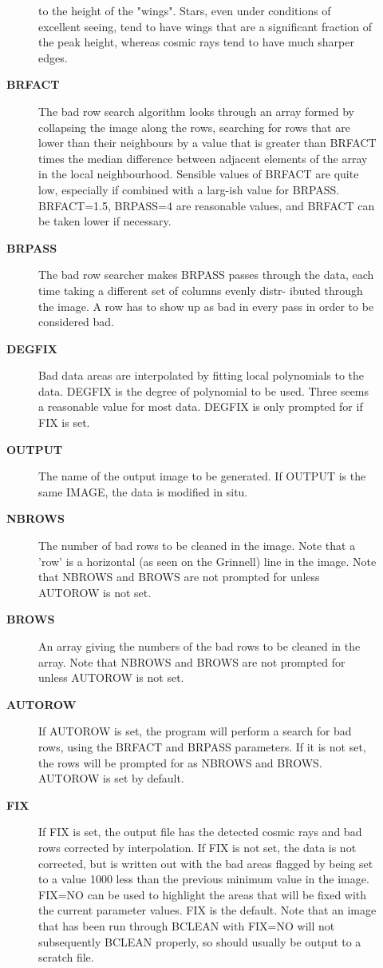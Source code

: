 \begin{description}
\begin{description}
 to the height of the "wings". Stars, even under conditions
 of excellent seeing, tend to have wings that are a
 significant fraction of the peak height, whereas cosmic
 rays tend to have much sharper edges.
\item [\textbf{BRFACT}]
 The bad row search algorithm looks through an array formed
 by collapsing the image along the rows, searching for rows
 that are lower than their neighbours by a value that is
 greater than BRFACT times the median difference between
 adjacent elements of the array in the local neighbourhood.
 Sensible values of BRFACT are quite low, especially if
 combined with a larg-ish value for BRPASS.  BRFACT=1.5,
 BRPASS=4 are reasonable values, and BRFACT can be taken
 lower if necessary.
\item [\textbf{BRPASS}]
 The bad row searcher makes BRPASS passes through the data,
 each time taking a different set of columns evenly distr-
 ibuted through the image.  A row has to show up as bad in
 every pass in order to be considered bad.
\item [\textbf{DEGFIX}]
 Bad data areas are interpolated by fitting local polynomials
 to the data.  DEGFIX is the degree of polynomial to be used.
 Three seems a reasonable value for most data.  DEGFIX is only
 prompted for if FIX is set.
\item [\textbf{OUTPUT}]
 The name of the output image to be generated.
 If OUTPUT is the same IMAGE, the data is modified in situ.
\item [\textbf{NBROWS}]
 The number of bad rows to be cleaned in the image.
 Note that a 'row' is a horizontal (as seen on the Grinnell)
 line in the image.  Note that NBROWS and BROWS are not
 prompted for unless AUTOROW is not set.
\item [\textbf{BROWS}]
 An array giving the numbers of the bad rows to be
 cleaned in the array.  Note that NBROWS and BROWS are not
 prompted for unless AUTOROW is not set.
\item [\textbf{AUTOROW}]
 If AUTOROW is set, the program will perform a search
 for bad rows, using the BRFACT and BRPASS parameters.  If it
 is not set, the rows will be prompted for as NBROWS and
 BROWS.  AUTOROW is set by default.
\item [\textbf{FIX}]
 If FIX is set, the output file has the detected cosmic
 rays and bad rows corrected by interpolation.  If FIX is not
 set, the data is not corrected, but is written out with
 the bad areas flagged by being set to a value 1000 less than
 the previous minimum value in the image.  FIX=NO can be used
 to highlight the areas that will be fixed with the current
 parameter values.  FIX is the default.  Note that an image
 that has been run through BCLEAN with FIX=NO will
 not subsequently BCLEAN properly, so should usually be output
 to a scratch file.


\end{description}
\end{description}
